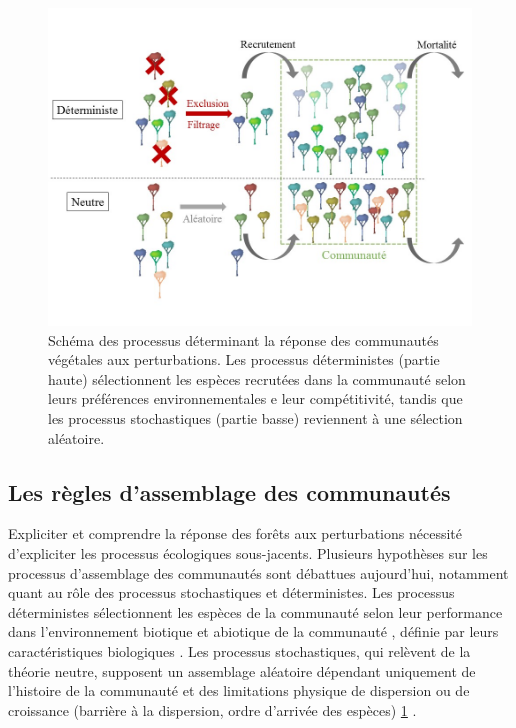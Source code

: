 \documentclass[
  11pt,
  french,
  A4paper,
  extrafontsizes,onecolumn,openright
  ]{memoir}
\begin{document}
\begin{figure}

{\centering \includegraphics[width=1\linewidth]{ExternalFig/Fig_AssemblyRules} 

}

\caption{Schéma des processus déterminant la réponse des communautés végétales aux perturbations. Les processus déterministes (partie haute) sélectionnent les espèces recrutées dans la communauté selon leurs préférences environnementales e leur compétitivité, tandis que les processus stochastiques (partie basse) reviennent à une sélection aléatoire.}\label{fig:AssemblyRules}
\end{figure}

\subsection{Les règles d'assemblage des
communautés}\label{les-regles-dassemblage-des-communautes}

Expliciter et comprendre la réponse des forêts aux perturbations
nécessité d'expliciter les processus écologiques sous-jacents. Plusieurs
hypothèses sur les processus d'assemblage des communautés sont débattues
aujourd'hui, notamment quant au rôle des processus stochastiques et
déterministes. Les processus déterministes sélectionnent les espèces de
la communauté selon leur performance dans l'environnement biotique et
abiotique de la communauté , définie par leurs caractéristiques
biologiques \autocite{Molino2001}. Les processus stochastiques, qui
relèvent de la théorie neutre, supposent un assemblage aléatoire
dépendant uniquement de l'histoire de la communauté et des limitations
physique de dispersion ou de croissance (barrière à la dispersion, ordre
d'arrivée des espèces) \ref{fig:AssemblyRules} \autocite{Hubbell2001}.
\end{document}
